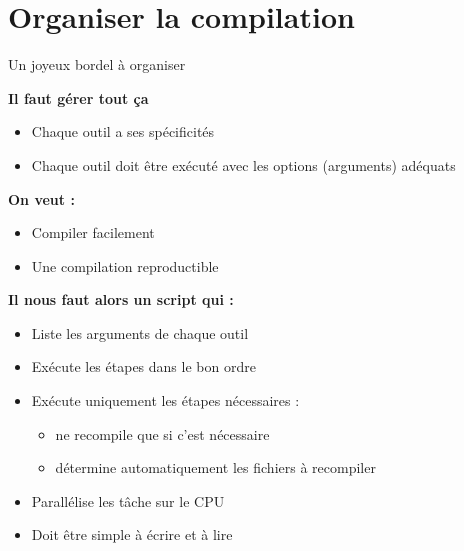 
\section{Organiser la compilation}

\begin{frame}{Un joyeux bordel à organiser}

  \textbf{\large Il faut gérer tout ça}
  \par
  \begin{itemize}
    \item Chaque outil a ses spécificités
    \item Chaque outil doit être exécuté avec les options (arguments) adéquats
  \end{itemize}
  \bigskip
  \textbf{\large On veut :}
  \begin{itemize}
    \item Compiler facilement
    \item Une compilation reproductible
  \end{itemize}
  \bigskip
  \textbf{\large Il nous faut alors un script qui :}
  \begin{itemize}
    \item Liste les arguments de chaque outil
    \item Exécute les étapes dans le bon ordre
    \item Exécute uniquement les étapes nécessaires :
      \begin{itemize}
        \item ne recompile que si c'est nécessaire
        \item détermine automatiquement les fichiers à recompiler
      \end{itemize}
    \item Parallélise les tâche sur le CPU
    \item Doit être simple à écrire et à lire
  \end{itemize}

\end{frame}


